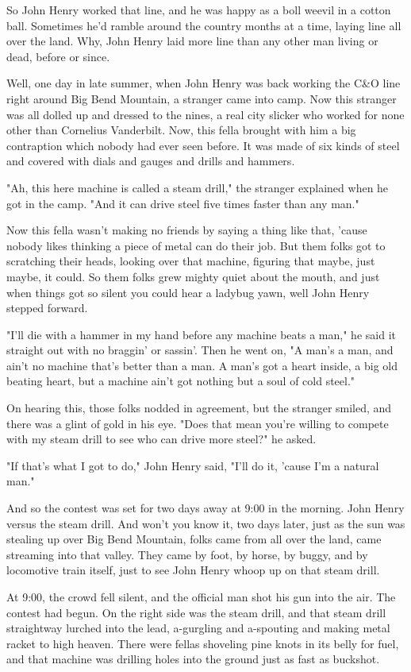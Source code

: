 So John Henry worked that line, and he was happy as a boll weevil in a cotton ball. Sometimes he'd ramble around the country months at a time, laying line all over the land. Why, John Henry laid more line than any other man living or dead, before or since.

Well, one day in late summer, when John Henry was back working the C\&O line right around Big Bend Mountain, a stranger came into camp. Now this stranger was all dolled up and dressed to the nines, a real city slicker who worked for none other than Cornelius Vanderbilt. Now, this fella brought with him a big contraption which nobody had ever seen before. It was made of six kinds of steel and covered with dials and gauges and drills and hammers.

"Ah, this here machine is called a steam drill," the stranger explained when he got in the camp. "And it can drive steel five times faster than any man."

Now this fella wasn't making no friends by saying a thing like that, 'cause nobody likes thinking a piece of metal can do their job. But them folks got to scratching their heads, looking over that machine, figuring that maybe, just maybe, it could. So them folks grew mighty quiet about the mouth, and just when things got so silent you could hear a ladybug yawn, well John Henry stepped forward.

"I'll die with a hammer in my hand before any machine beats a man," he said it straight out with no braggin' or sassin'. Then he went on, "A man's a man, and ain't no machine that's better than a man. A man's got a heart inside, a big old beating heart, but a machine ain't got nothing but a soul of cold steel."

On hearing this, those folks nodded in agreement, but the stranger smiled, and there was a glint of gold in his eye. "Does that mean you're willing to compete with my steam drill to see who can drive more steel?" he asked.

"If that's what I got to do," John Henry said, "I'll do it, 'cause I'm a natural man."

And so the contest was set for two days away at 9:00 in the morning. John Henry versus the steam drill. And won't you know it, two days later, just as the sun was stealing up over Big Bend Mountain, folks came from all over the land, came streaming into that valley. They came by foot, by horse, by buggy, and by locomotive train itself, just to see John Henry whoop up on that steam drill.

At 9:00, the crowd fell silent, and the official man shot his gun into the air. The contest had begun. On the right side was the steam drill, and that steam drill straightway lurched into the lead, a-gurgling and a-spouting and making metal racket to high heaven. There were fellas shoveling pine knots in its belly for fuel, and that machine was drilling holes into the ground just as fast as buckshot.


